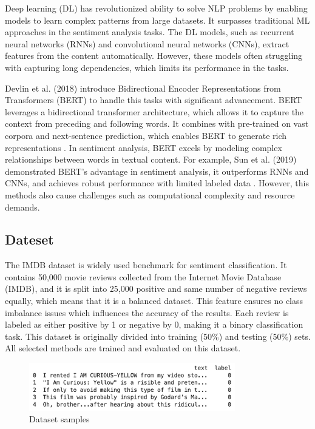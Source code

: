 Deep learning (DL) has revolutionized ability to solve NLP problems by enabling models to learn complex patterns from large datasets. It surpasses traditional ML approaches in the sentiment analysis tasks. The DL models, such as recurrent neural networks (RNNs) and convolutional neural networks (CNNs), extract features from the content automatically. However, these models often struggling with capturing long dependencies, which limits its performance in the tasks. 

Devlin et al. (2018) introduce Bidirectional Encoder Representations from Transformers (BERT) to handle this tasks with significant advancement. BERT leverages a bidirectional transformer architecture, which allows it to capture the context from preceding and following words. It combines with pre-trained on vast corpora and next-sentence prediction, which enables BERT to generate rich representations \cite{Devlin2018}. In sentiment analysis, BERT excels by modeling complex relationships between words in textual content. For example, Sun et al. (2019) demonstrated BERT's advantage in sentiment analysis, it outperforms RNNs and CNNs, and achieves robust performance with limited labeled data \cite{Sun2019}. However, this methods also cause challenges such as computational complexity and resource demands.

\subsection{Dateset}
The IMDB dataset is widely used benchmark for sentiment classification. It contains 50,000 movie reviews collected from the Internet Movie Database (IMDB), and it is split into 25,000 positive and same number of negative reviews equally, which means that it is a balanced dataset. This feature ensures no class imbalance issues which influences the accuracy of the results. Each review is labeled as either positive by 1 or negative by 0, making it a binary classification task. This dataset is originally divided into training (50\%) and testing (50\%) sets. All selected methods are trained and evaluated on this dataset.

\begin{figure}[ht]
    \centering
    \includegraphics[width=0.8\textwidth]{pics/data_sample.png}
    \caption{Dataset samples}
\end{figure}

